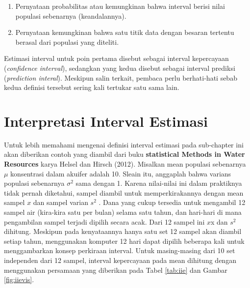 \documentclass[]{book}
\providecommand{\tightlist}{%
  \setlength{\itemsep}{0pt}\setlength{\parskip}{0pt}}
\begin{document}
\begin{enumerate}
\def\labelenumi{\arabic{enumi}.}
\tightlist
\item
  Pernyataan probabilitas atau kemungkinan bahwa interval berisi nilai
  populasi sebenarnya (keandalannya).
\item
  Pernyataan kemungkinan bahwa satu titik data dengan besaran tertentu
  berasal dari populasi yang diteliti.
\end{enumerate}

Estimasi interval untuk poin pertama disebut sebagai interval
kepercayaan (\emph{confidence interval}), sedangkan yang kedua disebut
sebagai interval prediksi (\emph{prediction interal}). Meskipun salin
terkait, pembaca perlu berhati-hati sebab kedua definisi tersebut sering
kali tertukar satu sama lain.

\section{Interpretasi Interval
Estimasi}\label{interpretasi-interval-estimasi}

Untuk lebih memahami mengenai definisi interval estimasi pada
sub-chapter ini akan diberikan contoh yang diambil dari buku
\textbf{statistical Methods in Water Resources} karya Helsel dan Hirsch
(2012). Misalkan mean populasi sebenarnya \(\mu\) konsentrasi dalam
akuifer adalah 10. Sleain itu, anggaplah bahwa varians populasi
sebenarnya \(\sigma^2\) sama dengan 1. Karena nilai-nilai ini dalam
praktiknya tidak pernah diketahui, sampel diambil untuk memperkirakannya
dengan mean sampel \(x\) dan sampel varian \(s^2\) . Dana yang cukup
tersedia untuk mengambil 12 sampel air (kira-kira satu per bulan) selama
satu tahun, dan hari-hari di mana pengambilan sampel terjadi dipilih
secara acak. Dari 12 sampel ini \(x\)x dan \(s^2\) dihitung. Meskipun
pada kenyataannya hanya satu set 12 sampel akan diambil setiap tahun,
menggunakan komputer 12 hari dapat dipilih beberapa kali untuk
menggambarkan konsep perkiraan interval. Untuk masing-masing dari 10 set
independen dari 12 sampel, interval kepercayaan pada mean dihitung
dengan menggunakan persamaan yang diberikan pada Tabel \ref{tab:iie} dan
Gambar \ref{fig:iievis}.
\end{document}
